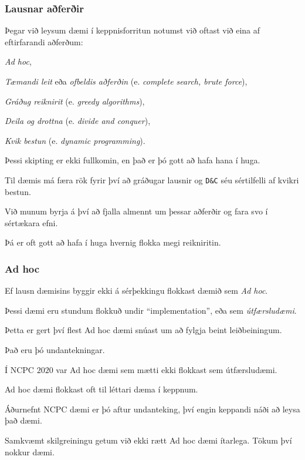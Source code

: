 {
	\frametitle{Lausnar aðferðir}
	{
		\item<1-> Þegar við leysum dæmi í keppnisforritun notumst við oftast við eina af eftirfarandi aðferðum:
		{
			\item<2-> \emph{Ad hoc},
			\item<3-> \emph{Tæmandi leit} eða \emph{ofbeldis aðferðin} (e. \emph{complete search, brute force}),
			\item<4-> \emph{Gráðug reiknirit} (e. \emph{greedy algorithms}),
			\item<5-> \emph{Deila og drottna} (e. \emph{divide and conquer}),
			\item<6-> \emph{Kvik bestun} (e. \emph{dynamic programming}).
		}
		\item<7-> Þessi skipting er ekki fullkomin, en það er þó gott að hafa hana í huga.
		\item<8-> Til dæmis má færa rök fyrir því að gráðugar lausnir og \texttt{D\&C} séu sértilfelli af kvikri bestun.
		\item<9-> Við munum byrja á því að fjalla almennt um þessar aðferðir og fara svo í sértækara efni.
		\item<10-> Þá er oft gott að hafa í huga hvernig flokka megi reikniritin.
	}
}

{
	\frametitle{Ad hoc}
	{
		\item<1-> Ef lausn dæmisins byggir ekki á sérþekkingu flokkast dæmið sem \emph{Ad hoc}.
		\item<2-> Þessi dæmi eru stundum flokkuð undir ``implementation'', eða sem \emph{útfærsludæmi}.
		\item<3-> Þetta er gert því flest Ad hoc dæmi snúast um að fylgja beint leiðbeiningum.
		\item<4-> Það eru þó undantekningar.
		\item<5-> Í NCPC $2020$ var Ad hoc dæmi sem mætti ekki flokkast sem útfærsludæmi.
		\item<6-> Ad hoc dæmi flokkast oft til léttari dæma í keppnum.
		\item<7-> Áðurnefnt NCPC dæmi er þó aftur undanteking, því engin keppandi náði að leysa það dæmi.
		\item<8-> Samkvæmt skilgreiningu getum við ekki rætt Ad hoc dæmi ítarlega. Tökum því nokkur dæmi.
	}
}

